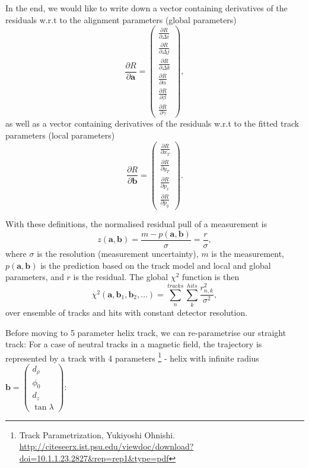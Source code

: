 \documentclass[a4paper,11pt]{article}
\begin{document}
In the end, we would like to write down a vector containing derivatives of the residuals w.r.t to the alignment parameters (global parameters)
\begin{equation}
\frac{\partial R}{\partial \textbf{a}} = \begin{pmatrix} \frac{\partial R}{\partial\Delta i} \\ \frac{\partial R}{\partial\Delta j} \\ \frac{\partial R}{\partial\Delta k} \\ \frac{\partial R}
{\partial\alpha} \\ \frac{\partial R}{\partial\beta} \\ \frac{\partial R}{\partial\gamma} \end{pmatrix},
\end{equation}
as well as a vector containing derivatives of the residuals w.r.t to the fitted track parameters (local parameters)
\begin{equation}
\frac{\partial R}{\partial \textbf{b}} = \begin{pmatrix} \frac{\partial R}{\partial x_T} \\ \frac{\partial R}{\partial y_T} \\ \frac{\partial R}{\partial p_x} \\ \frac{\partial R}{\partial p_y}  \end{pmatrix}.
\end{equation}

With these definitions, the normalised residual pull of a measurement is
\begin{equation}
z(\textbf{a}, \textbf{b}) = \frac{m-p(\textbf{a}, \textbf{b})}{\sigma} = \frac{r}{\sigma},
\end{equation}
where $\sigma$ is the resolution (measurement uncertainty), $m$ is the measurement, $p(\textbf{a}, \textbf{b})$ is the prediction based on the track model and local and global parameters, and $r$ is the residual. The global $\chi^2$ function is then
\begin{equation}
\chi^2(\textbf{a}, \textbf{b}_1,\textbf{b}_2, ...) = \sum_{n}^{tracks}\sum_{k}^{hits}  \frac{r_{n,k}^2}{\sigma^2},
\end{equation}
over ensemble of tracks and hits with constant detector resolution.  



Before moving to 5 parameter helix track, we can re-parametrise our straight track:
For a case of neutral tracks in a magnetic field, the trajectory is represented by a track with 4 parameters \footnote{Track Parametrization, Yukiyoshi Ohnishi. \url{http://citeseerx.ist.psu.edu/viewdoc/download?doi=10.1.1.23.2827&rep=rep1&type=pdf}} - helix with infinite radius $\textbf{b} = \begin{pmatrix} d_\rho \\ \phi_0 \\ d_z \\ \tan \lambda \end{pmatrix}$:
\end{document}
